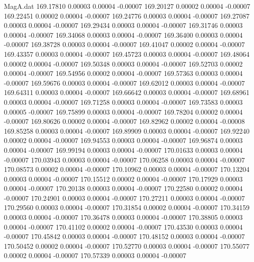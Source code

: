 \begin{filecontents}{MagA.dat}
 169.17810    0.00003    0.00004   -0.00007
 169.20127    0.00002    0.00004   -0.00007
 169.22451    0.00002    0.00004   -0.00007
 169.24776    0.00003    0.00004   -0.00007
 169.27087    0.00003    0.00004   -0.00007
 169.29434    0.00003    0.00004   -0.00007
 169.31746    0.00003    0.00004   -0.00007
 169.34068    0.00003    0.00004   -0.00007
 169.36400    0.00003    0.00004   -0.00007
 169.38728    0.00003    0.00004   -0.00007
 169.41047    0.00002    0.00004   -0.00007
 169.43357    0.00003    0.00004   -0.00007
 169.45723    0.00003    0.00004   -0.00007
 169.48064    0.00002    0.00004   -0.00007
 169.50348    0.00003    0.00004   -0.00007
 169.52703    0.00002    0.00004   -0.00007
 169.54956    0.00002    0.00004   -0.00007
 169.57363    0.00003    0.00004   -0.00007
 169.59676    0.00003    0.00004   -0.00007
 169.62012    0.00003    0.00004   -0.00007
 169.64311    0.00003    0.00004   -0.00007
 169.66642    0.00003    0.00004   -0.00007
 169.68961    0.00003    0.00004   -0.00007
 169.71258    0.00003    0.00004   -0.00007
 169.73583    0.00003    0.00005   -0.00007
 169.75899    0.00003    0.00004   -0.00007
 169.78204    0.00002    0.00004   -0.00007
 169.80626    0.00002    0.00004   -0.00007
 169.82962    0.00002    0.00004   -0.00008
 169.85258    0.00003    0.00004   -0.00007
 169.89909    0.00003    0.00004   -0.00007
 169.92240    0.00002    0.00004   -0.00007
 169.94553    0.00003    0.00004   -0.00007
 169.96874    0.00003    0.00004   -0.00007
 169.99194    0.00003    0.00004   -0.00007
 170.01633    0.00003    0.00004   -0.00007
 170.03943    0.00003    0.00004   -0.00007
 170.06258    0.00003    0.00004   -0.00007
 170.08573    0.00002    0.00004   -0.00007
 170.10962    0.00003    0.00004   -0.00007
 170.13204    0.00003    0.00004   -0.00007
 170.15512    0.00002    0.00004   -0.00007
 170.17929    0.00003    0.00004   -0.00007
 170.20138    0.00003    0.00004   -0.00007
 170.22580    0.00002    0.00004   -0.00007
 170.24901    0.00003    0.00004   -0.00007
 170.27211    0.00003    0.00004   -0.00007
 170.29560    0.00003    0.00004   -0.00007
 170.31854    0.00002    0.00004   -0.00007
 170.34159    0.00003    0.00004   -0.00007
 170.36478    0.00003    0.00004   -0.00007
 170.38805    0.00003    0.00004   -0.00007
 170.41102    0.00002    0.00004   -0.00007
 170.43530    0.00003    0.00004   -0.00007
 170.45842    0.00003    0.00004   -0.00007
 170.48152    0.00003    0.00004   -0.00007
 170.50452    0.00002    0.00004   -0.00007
 170.52770    0.00003    0.00004   -0.00007
 170.55077    0.00002    0.00004   -0.00007
 170.57339    0.00003    0.00004   -0.00007

\end{filecontents}
